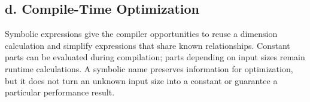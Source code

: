 \subsection*{\textbf{d. Compile-Time Optimization}}

Symbolic expressions give the compiler opportunities to reuse a dimension calculation and simplify expressions that share known relationships. Constant parts can be evaluated during compilation; parts depending on input sizes remain runtime calculations. A symbolic name preserves information for optimization, but it does not turn an unknown input size into a constant or guarantee a particular performance result.
